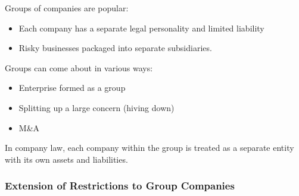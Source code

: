 \documentclass[
]{article}
\providecommand{\tightlist}{%
  \setlength{\itemsep}{0pt}\setlength{\parskip}{0pt}}
\begin{document}
Groups of companies are popular:

\begin{itemize}
\tightlist
\item
  Each company has a separate legal personality and limited liability
\item
  Risky businesses packaged into separate subsidiaries.
\end{itemize}

Groups can come about in various ways:

\begin{itemize}
\tightlist
\item
  Enterprise formed as a group
\item
  Splitting up a large concern (hiving down)
\item
  M\&A
\end{itemize}

In company law, each company within the group is treated as a separate
entity with its own assets and liabilities.

\hypertarget{extension-of-restrictions-to-group-companies}{%
\subsubsection{Extension of Restrictions to Group
Companies}\label{extension-of-restrictions-to-group-companies}}
\end{document}
